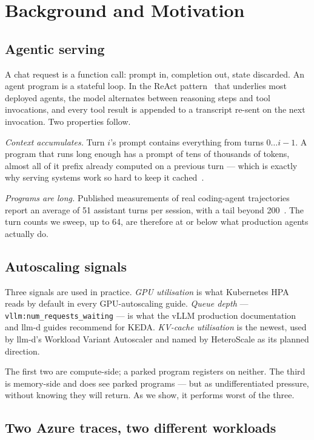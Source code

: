 \documentclass[sigconf,nonacm]{acmart}
\newcommand{\code}[1]{\texttt{\small #1}}
\begin{document}
\section{Background and Motivation}
\label{sec:motivation}

\subsection{Agentic serving}

A chat request is a function call: prompt in, completion out, state
discarded. An agent program is a stateful loop. In the ReAct
pattern~\cite{react} that underlies most deployed agents, the model
alternates between reasoning steps and tool invocations, and every tool
result is appended to a transcript re-sent on the next invocation. Two
properties follow.

\emph{Context accumulates.} Turn $i$'s prompt contains everything from
turns $0\ldots i{-}1$. A program that runs long enough has a prompt of
tens of thousands of tokens, almost all of it prefix already computed on
a previous turn --- which is exactly why serving systems work so hard to
keep it cached~\cite{vllm}.

\emph{Programs are long.} Published measurements of real coding-agent
trajectories report an average of 51 assistant turns per session, with a
tail beyond 200~\cite{polar}. The turn counts we sweep, up to 64, are
therefore at or below what production agents actually do.

\subsection{Autoscaling signals}

Three signals are used in practice. \emph{GPU utilisation} is what
Kubernetes HPA reads by default in every GPU-autoscaling guide.
\emph{Queue depth} --- \code{vllm:num\_requests\_waiting} --- is what the
vLLM production documentation and llm-d guides recommend for KEDA.
\emph{KV-cache utilisation} is the newest, used by llm-d's Workload
Variant Autoscaler and named by HeteroScale as its planned direction.

The first two are compute-side; a parked program registers on neither.
The third is memory-side and does see parked programs --- but as
undifferentiated pressure, without knowing they will return. As we show,
it performs worst of the three.

\subsection{Two Azure traces, two different workloads}
\end{document}
